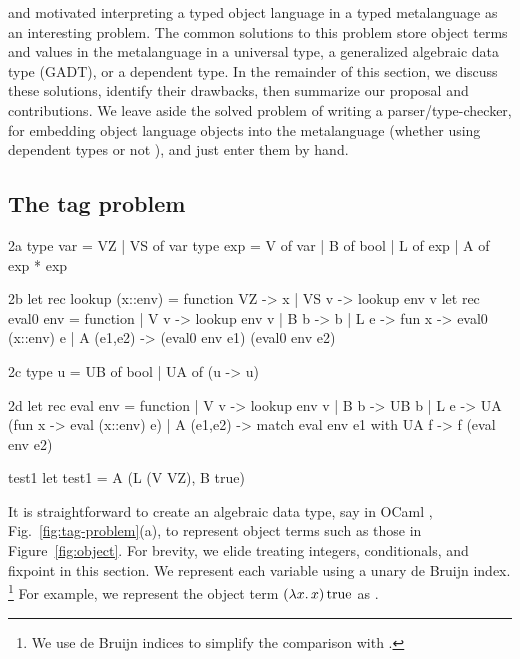  and \citet{xi-guarded} motivated interpreting
a typed object language in a typed metalanguage as an interesting
problem.  The common solutions to this problem store object terms and
values in the metalanguage in a universal type, a generalized algebraic
data type (GADT), or a dependent type.  In the remainder of this section,
we discuss these solutions, identify their drawbacks, then summarize our
proposal and contributions.  
\ifshort
We leave aside the solved problem of writing a parser\slash type\hyp checker,
for embedding object language objects into the metalanguage
(whether using dependent types \citep{WalidICFP02} or not \citep{baars-typing}),
and just enter them by hand.
\fi

\subsection{The tag problem}\label{tagproblem}

\begin{SaveVerbatim}{2a}
type var = VZ | VS of var
type exp = V of var | B of bool | L of exp | A of exp * exp
\end{SaveVerbatim}
\begin{SaveVerbatim}[commandchars=\@\{\}]{2b}
let rec lookup (x::env) = function VZ -> x | VS v -> lookup env v
let rec eval0 env = function
| V v       -> lookup env v
| B b       -> b 
| L e       -> fun x -> eval0 (x::env) e
| A (e1,e2) -> (eval0 env e1) (eval0 env e2) 
\end{SaveVerbatim}
\begin{SaveVerbatim}{2c}
type u = UB of bool | UA of (u -> u)
\end{SaveVerbatim}
\begin{SaveVerbatim}{2d}
let rec eval env = function
| V v       -> lookup env v
| B b       -> UB b
| L e       -> UA (fun x -> eval (x::env) e)
| A (e1,e2) -> match eval env e1 with UA f -> f (eval env e2)
\end{SaveVerbatim}
\begin{SaveVerbatim}{test1}
let test1 = A (L (V VZ), B true)
\end{SaveVerbatim}

It is straightforward to create an algebraic data type, say in OCaml%
\ifshort, Fig.~\ref{fig:tag-problem}(a)\fi, to
represent object terms such as those in Figure~\ref{fig:object}.
For brevity, we elide treating integers, conditionals, and fixpoint in
this section.
\ifshort\else{}\fi
We represent each variable using a unary de Bruijn index.%
\footnote{We use de Bruijn indices to simplify the comparison with
\citet{WalidICFP02}.}
For example, we represent the object term $(\mathopen{\lambda\mathord{x}.\,}x)\mathinner{\mathrm{true}}$ as
\ifshort {}.\else {}\fi
\ifshort

